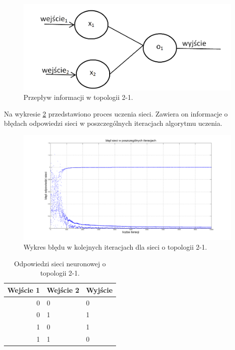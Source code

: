 \begin{figure}[!htbp]
\centering
\includegraphics[width=0.7\linewidth]{./include/flow_2_1}
\caption{Przepływ informacji w topologii 2-1.}
\label{fig:flow_2_1}
\end{figure}

Na wykresie \ref{fig:neuro_2_1} przedstawiono proces uczenia sieci. Zawiera on informacje o błędach odpowiedzi sieci w poszczególnych iteracjach algorytmu uczenia.

\begin{figure}[!h]
\centering
\includegraphics[width=1\linewidth]{./include/topologia_2_1}
\caption{Wykres błędu w kolejnych iteracjach dla sieci o topologii 2-1.}
\label{fig:neuro_2_1}
\end{figure}

\begin{table}
\centering

\label{tab:xor_output_2_1}
\begin{tabular}{|r|l|l|}
  \hline 
  Wejście 1 & Wejście 2 & Wyjście \\
  \hline 
  0 & 0 & 0 \\
  \hline
  0 & 1 & 1 \\
  \hline
  1 & 0 & 1 \\
  \hline
  1 & 1 & 0 \\
  \hline
\end{tabular}
\caption{Odpowiedzi sieci neuronowej o topologii 2-1.}
\end{table}

